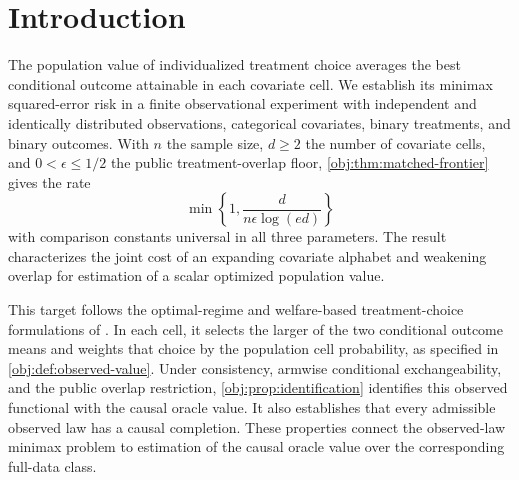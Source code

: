 \begin{abstract}
We characterize the minimax squared-error risk for estimating the observed optimal treatment value from independent and identically distributed observational data with categorical covariates, binary treatments, and binary outcomes. For sample size \(n\), number of covariate cells \(d\ge2\), and public treatment-overlap floor \(0<\epsilon\le1/2\), the risk is of order
\[
\min\left\{1,\frac{d}{n\epsilon\log(ed)}\right\},
\]
with universal comparison constants. The characterization is uniform over unknown cell masses, propensities satisfying the public floor, and conditional outcome means, including treatment-effect ties and null cells. We construct a deterministic observed-data estimator that attains this rate through armwise localization, Jackson polynomial approximation, factorial statistics, and conditional averaging of an auxiliary capped-Poisson construction. The matching lower bound uses weighted approximation and moment-matched probability priors with prescribed common mean, together with a comparison of the full observed likelihood. Consequently, uniform mean-square consistency along growing-cell and shrinking-overlap sequences is possible exactly when \(d/[n\epsilon\log(ed)]\to0\). Under consistency and armwise conditional exchangeability, the same risk characterization applies to the causal oracle value.
\end{abstract}

\section{Introduction}

The population value of individualized treatment choice averages the best conditional outcome attainable in each covariate cell. We establish its minimax squared-error risk in a finite observational experiment with independent and identically distributed observations, categorical covariates, binary treatments, and binary outcomes. With \(n\) the sample size, \(d\ge2\) the number of covariate cells, and \(0<\epsilon\le1/2\) the public treatment-overlap floor, \cref{obj:thm:matched-frontier} gives the rate
\[
\min\left\{1,\frac{d}{n\epsilon\log(ed)}\right\}
\]
with comparison constants universal in all three parameters. The result characterizes the joint cost of an expanding covariate alphabet and weakening overlap for estimation of a scalar optimized population value.

This target follows the optimal-regime and welfare-based treatment-choice formulations of \citet{Murphy2003,Manski2004}. In each cell, it selects the larger of the two conditional outcome means and weights that choice by the population cell probability, as specified in \cref{obj:def:observed-value}. Under consistency, armwise conditional exchangeability, and the public overlap restriction, \cref{obj:prop:identification} identifies this observed functional with the causal oracle value. It also establishes that every admissible observed law has a causal completion. These properties connect the observed-law minimax problem to estimation of the causal oracle value over the corresponding full-data class.

